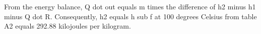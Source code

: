 From the energy balance, Q dot out equals m times the difference of h2 minus h1 minus Q dot R. Consequently, h2 equals h sub f at 100 degrees Celsius from table A2 equals 292.88 kilojoules per kilogram.